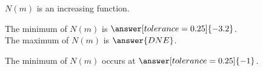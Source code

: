 \documentclass{ximera}
\begin{document}
\begin{exercise}
\begin{question}
$N(m)$ is an increasing function.
\begin{multipleChoice}
\end{multipleChoice}

\end{question}









\begin{question} 



The minimum of $N(m)$ is $\answer[tolerance=0.25]{-3.2}$.   \\

The maximum of $N(m)$ is $\answer{DNE}$.
 

\end{question}






\begin{question} 


The minimum of $N(m)$ occurs at $\answer[tolerance=0.25]{-1}$.   

\end{question}









\end{exercise}
\end{document}
